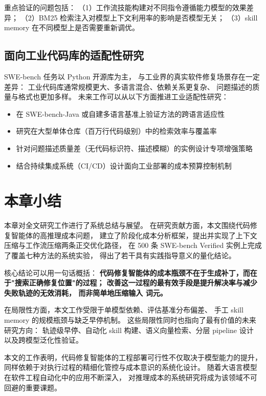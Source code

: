 重点验证的问题包括：
（1）工作流技能构建对不同指令遵循能力模型的效果差异；
（2）BM25 检索注入对模型上下文利用率的影响是否模型无关；
（3）skill memory 在不同模型上是否需要重新调优。

\subsection{面向工业代码库的适配性研究}
\label{subsec:future-industrial}

SWE-bench 任务以 Python 开源库为主，
与工业界的真实软件修复场景存在一定差异：
工业代码库通常规模更大、多语言混合、依赖关系更复杂、
问题描述的质量与格式也更加多样。
未来工作可以从以下方面推进工业适配性研究：
\begin{itemize}
  \item 在 SWE-bench-Java 或自建多语言基准上验证方法的跨语言适应性
  \item 研究在大型单体仓库（百万行代码级别）中的检索效率与覆盖率
  \item 针对问题描述质量差（无代码标识符、描述模糊）的实例设计专项增强策略
  \item 结合持续集成系统（CI/CD）设计面向工业部署的成本预算控制机制
\end{itemize}


\section{本章小结}
\label{sec:chap07-summary}

本章对全文研究工作进行了系统总结与展望。
在研究贡献方面，本文围绕代码修复智能体的高推理成本问题，
建立了阶段化成本分析框架，提出并实现了上下文压缩与工作流压缩两条正交优化路径，
在 500 条 SWE-bench Verified 实例上完成了覆盖七种方法的系统实验，
得出了若干具有实践指导意义的量化结论。

核心结论可以用一句话概括：
\textbf{代码修复智能体的成本瓶颈不在于生成补丁，而在于"搜索正确修复位置"的过程；
改善这一过程的最有效手段是提升解决率与减少失败轨迹的无效消耗，
而非简单地压缩输入 词元。}

在局限性方面，本文工作受限于单模型依赖、评估基准分布偏差、
手工 skill memory 的规模瓶颈与缺乏早停机制。
这些局限性同时也指向了最有价值的未来研究方向：
轨迹级早停、自动化 skill 构建、语义向量检索、分层 pipeline 设计
以及跨模型泛化性验证。

本文的工作表明，代码修复智能体的工程部署可行性不仅取决于模型能力的提升，
同样依赖于对执行过程的精细化管控与成本意识的系统化设计。
随着大语言模型在软件工程自动化中的应用不断深入，
对推理成本的系统研究将成为该领域不可回避的重要课题。
